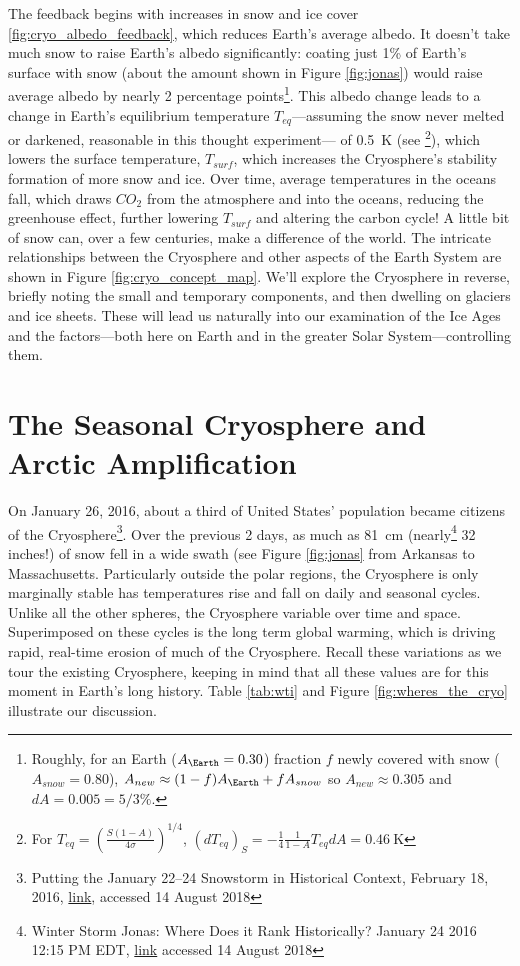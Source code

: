 \documentclass[amstex,12pt]{book}
\begin{document}
The feedback begins with increases in snow and ice cover \ref{fig:cryo_albedo_feedback}, which reduces Earth's average albedo. It doesn't take much snow to raise Earth's albedo significantly: coating just 1\% of Earth's surface with snow (about the amount shown in Figure \ref{fig:jonas}) would raise average albedo by nearly 2 percentage points\footnote{Roughly, for an Earth ($A_\Earth=0.30$) fraction $f$ newly covered with snow ($A_{snow}=0.80$), $A_{new} \approx (1-f)A_\Earth+fA_{snow}$ so $A_{new} \approx 0.305$ and $dA=0.005=5/3\%$.}. This albedo change leads to a change in Earth's equilibrium temperature $T_{eq}$---assuming the snow never melted or darkened, reasonable in this thought experiment--- of \SI{0.5}{K} (see \footnote{For $T_{eq}=\left(\frac{S(1-A)}{4\sigma}\right)^{1/4}$, $\left(dT_{eq}\right)_S=-\frac{1}{4}\frac{1}{1-A}T_{eq}dA=\SI{0.46}{\kelvin}$}), which lowers the surface temperature, $T_{surf}$, which increases the Cryosphere's stability formation of more snow and ice. Over time, average temperatures in the oceans fall, which draws $CO_2$ from the atmosphere and into the oceans, reducing the greenhouse effect, further lowering $T_{surf}$ and altering the carbon cycle! A little bit of snow can, over a few centuries, make a difference of the world. The intricate relationships between the Cryosphere and other aspects of the Earth System are shown in Figure \ref{fig:cryo_concept_map}. We'll explore the Cryosphere in reverse, briefly noting the small and temporary components, and then dwelling on glaciers and ice sheets. These will lead us naturally into our examination of the Ice Ages and the factors---both here on Earth and in the greater Solar System---controlling them. 

 

 
\section{The Seasonal Cryosphere and Arctic Amplification}
On January 26, 2016, about a third of United States' population became citizens of the Cryosphere\footnote{Putting the January 22–24 Snowstorm in Historical Context, February 18, 2016, \href{https://www.ncdc.noaa.gov/news/january-22-24-2016-snowstorm-in-historical-context}{link}, accessed 14 August 2018}. Over the previous 2 days, as much as \SI{81}{\centi\metre} (nearly\footnote{Winter Storm Jonas: Where Does it Rank Historically? January 24 2016 12:15 PM EDT, \href{https://weather.com/storms/winter/news/winter-storm-jonas-rank-in-history}{link} accessed 14 August 2018} 32 inches!) of snow fell in a wide swath (see Figure \ref{fig:jonas} from Arkansas to Massachusetts. Particularly outside the polar regions, the Cryosphere is only marginally stable has temperatures rise and fall on daily and seasonal cycles. Unlike all the other spheres, the Cryosphere variable over time and space. Superimposed on these cycles is the long term global warming, which is driving rapid, real-time erosion of much of the Cryosphere. Recall these variations as we tour the existing Cryosphere, keeping in mind that all these values are for this moment in Earth's long history. Table \ref{tab:wti} and Figure \ref{fig:wheres_the_cryo} illustrate our discussion.
\end{document}
